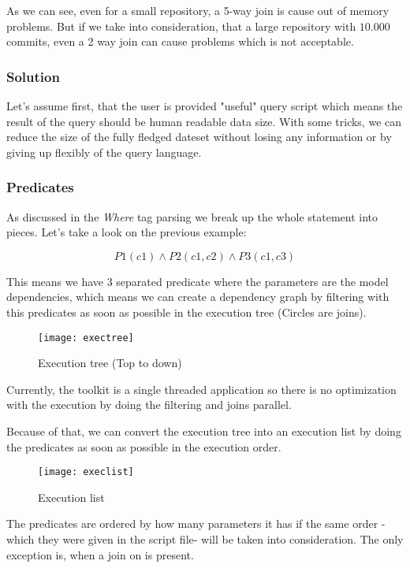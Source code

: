 As we can see, even for a small repository, a 5-way join is cause out of memory problems. But if we take into consideration, that a large repository with $10.000$ commits, even a 2 way join can cause problems which is not acceptable. 
\newpage

\subsubsection{Solution}

Let’s assume first, that the user is provided "useful" query script which means the result of the query should be human readable data size. With some tricks, we can reduce the size of the fully fledged dateset without losing any information or by giving up flexibly of the query language. 

\subsubsection{Predicates}

As discussed in the \textit{Where} tag parsing we break up the whole statement into pieces. Let's take a look on the previous example:

\[ P1(c1) \wedge P2(c1,c2) \wedge P3(c1,c3)\]

This means we have 3 separated predicate where the parameters are the model dependencies, which means we can create a dependency graph by filtering with this predicates as soon as possible  in the execution tree (Circles are joins).

\begin{figure}[H]
	\centering
	\texttt{[image: exectree]}
	\caption{Execution tree (Top to down)}
	\label{fig:fig-elist}
\end{figure}

\newpage

Currently, the toolkit is a single threaded application so there is no optimization with the execution by doing the filtering and joins parallel.

Because of that, we can convert the execution tree into an execution list by doing the predicates as soon as possible in the execution order.

\begin{figure}[H]
	\centering
	\texttt{[image: execlist]}
	\caption{Execution list}
	\label{fig:fig-liste}
\end{figure}
The predicates are ordered by how many parameters it has if the same order -which they were given in the script file- will be taken into consideration. The only exception is, when a join on is present.

